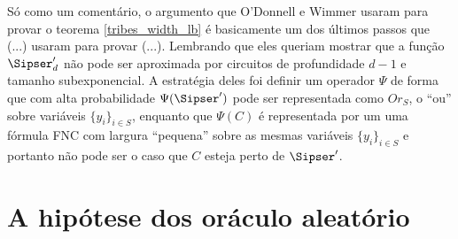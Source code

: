 Só como um comentário, o argumento que O'Donnell e Wimmer usaram para provar o teorema \ref{tribes_width_lb} é basicamente um dos últimos passos que (...) usaram para provar (...). Lembrando que eles queriam mostrar que a função $\Sipser^{\prime}_{d}$ não pode ser aproximada por circuitos de profundidade $d - 1$ e tamanho subexponencial. A estratégia deles foi definir um operador $\Psi$ de forma que com alta probabilidade $\Psi(\Sipser^{\prime})$ pode ser representada como $Or_{S}$, o ``ou'' sobre variáveis $\{y_{i}\}_{i \in S}$, enquanto que $\Psi(C)$ é representada por um uma fórmula FNC com largura ``pequena'' sobre as mesmas variáveis $\{y_{i}\}_{i \in S}$ e portanto não pode ser o caso que $C$ esteja perto de $\Sipser^{\prime}$.

\section{A hipótese dos oráculo aleatório} \label{section_random_oracle_hypothesis}